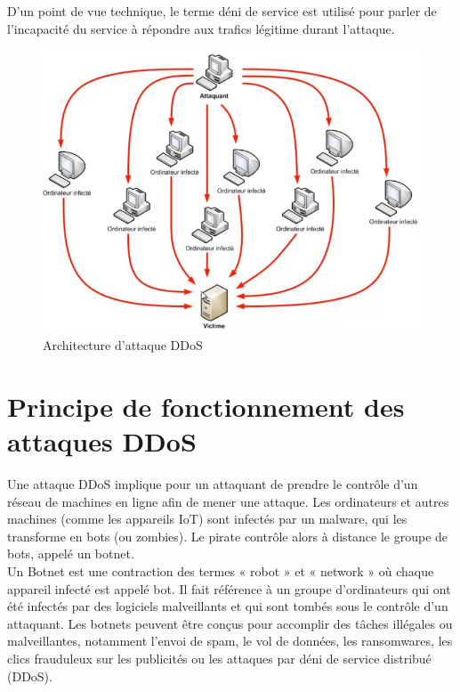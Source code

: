 D’un point de vue technique, le terme déni de service est utilisé pour parler de l’incapacité du service à répondre aux trafics légitime durant l’attaque.\\

	\begin{figure}[ht]
		\begin{center}
			\includegraphics[width=\textwidth]{IMAGES/ORIGINALS/Architecture_attaque_DDoS}
		\end{center}
		\caption{Architecture d'attaque DDoS}
	\end{figure}

	\pagebreak
	\section{Principe de fonctionnement des attaques DDoS}
	Une attaque DDoS implique pour un attaquant de prendre le contrôle d'un réseau de machines en ligne afin de mener une attaque. Les ordinateurs et autres machines (comme les appareils IoT) sont infectés par un malware, qui les transforme en bots (ou zombies). Le pirate contrôle alors à distance le groupe de bots, appelé un botnet.\\
	
	Un Botnet est une contraction des termes « robot » et « network » où chaque appareil infecté est appelé bot. Il fait référence à un groupe d'ordinateurs qui ont été infectés par des logiciels malveillants et qui sont tombés sous le contrôle d'un attaquant. Les botnets peuvent être conçus pour accomplir des tâches illégales ou malveillantes, notamment l'envoi de spam, le vol de données, les ransomwares, les clics frauduleux sur les publicités ou les attaques par déni de service distribué (DDoS).\\
	
